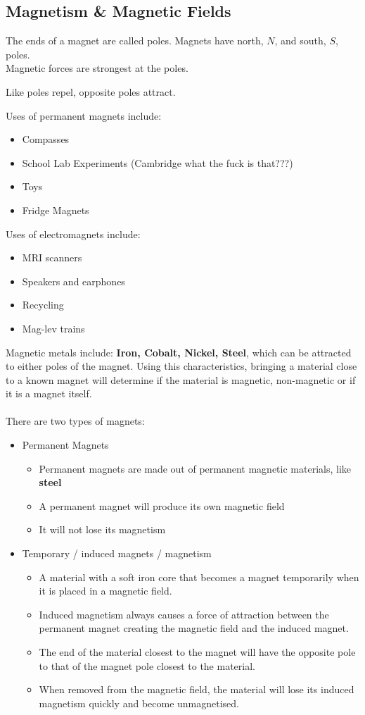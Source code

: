 \documentclass[a4paper,12pt]{article}
\begin{document}
\subsection{Magnetism \& Magnetic Fields}
The ends of a magnet are called poles. Magnets have north, \(N\), and south, \(S\), poles.\\
Magnetic forces are strongest at the poles. 
\begin{center}Like poles repel, opposite poles attract. \end{center}
Uses of permanent magnets include:
\begin{itemize}
    \item Compasses
    \item School Lab Experiments (Cambridge what the fuck is that???)
    \item Toys
    \item Fridge Magnets
\end{itemize}
Uses of electromagnets include:
\begin{itemize}
    \item MRI scanners
    \item Speakers and earphones
    \item Recycling
    \item Mag-lev trains
\end{itemize}
Magnetic metals include: \textbf{Iron, Cobalt, Nickel, Steel}, which can be attracted to either poles of the magnet. 
Using this characteristics, bringing a material close to a known magnet will determine if the material is magnetic, non-magnetic or if it is a magnet itself.
\\\\
There are two types of magnets: 
\begin{itemize}
    \item Permanent Magnets
    \begin{itemize}
        \item Permanent magnets are made out of permanent magnetic materials, like \textbf{steel}
        \item A permanent magnet will produce its own magnetic field
        \item It will not lose its magnetism
    \end{itemize}
    \item Temporary / induced magnets / magnetism
    \begin{itemize}
        \item A material with a soft iron core that becomes a magnet temporarily when it is placed in a magnetic field.
        \item Induced magnetism always causes a force of attraction between the permanent magnet creating the magnetic field and the induced magnet.
        \item The end of the material closest to the magnet will have the opposite pole to that of the magnet pole closest to the material.
        \item When removed from the magnetic field, the material will lose its induced magnetism quickly and become unmagnetised.
    \end{itemize}
\end{itemize}
\end{document}

